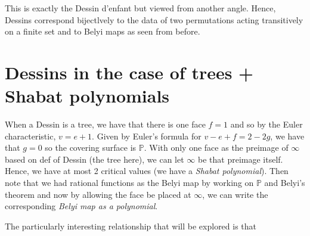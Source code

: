 \documentclass{article}
\theoremstyle{definition}
\newcommand{\PP}{\mathbb{P}}
\begin{document}
This is exactly the Dessin d'enfant but viewed from another angle. Hence, Dessins correspond bijectlvely to the data of two permutations acting transitively on a finite set and to Belyi maps as seen from before.

\section{Dessins in the case of trees + Shabat polynomials}
When a Dessin is a tree, we have that there is one face $f=1$ and so by the Euler characteristic, $v=e+1$. Given by Euler's formula for $v-e+f=2-2g$, we have that $g=0$ so the covering surface is $\PP$. With only one face as the preimage of $\infty$ based on def of Dessin (the tree here), we can let $\infty$ be that preimage itself. Hence, we have at most 2 critical values (we have a \emph{Shabat polynomial}). Then note that we had rational functions as the Belyi map by working on $\PP$ and Belyi's theorem and now by allowing the face be placed at $\infty$, we can write the corresponding \emph{Belyi map as a polynomial}.

The particularly interesting relationship that will be explored is that 

\noindent{}



\end{document}
